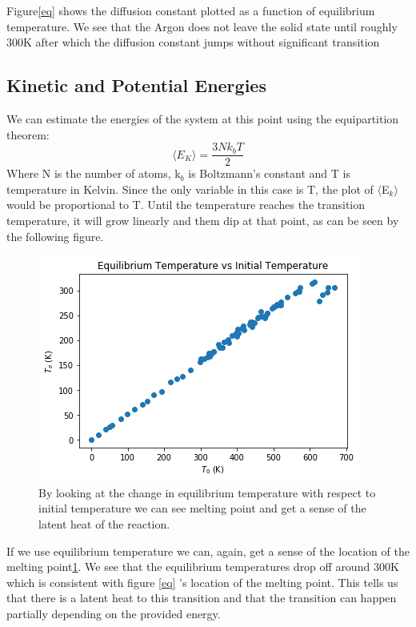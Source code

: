 \documentclass[11pt,twocolumn]{article}
\begin{document}
Figure\ref{eq} shows the diffusion constant plotted as a function of  equilibrium temperature. We see that the Argon does not leave the solid state until roughly 300K after which the diffusion constant jumps without significant transition 
\subsection{Kinetic and Potential Energies}
We can estimate the energies of the system at this point using the equipartition theorem\cite{Kinetic}:
\begin{equation}
\langle E_K\rangle=\frac{3Nk_bT}{2}
\end{equation}
Where N is the number of atoms, k$_b$ is Boltzmann's constant and T is temperature in Kelvin. Since the only variable in this case is T, the plot of $\langle$E$_k\rangle$ would be proportional to T. Until the temperature reaches the transition temperature, it will grow linearly and them dip at that point, as can be seen by the following figure.
\begin{figure}
\includegraphics[width=\columnwidth]{tevt0.png}
\caption{By looking at the change in equilibrium temperature with respect to initial temperature we can see melting point and get a sense of the latent heat of the reaction.}
\label{tevt0}
\end{figure}
If we use equilibrium temperature we can, again, get a sense of the location of the melting point\ref{tevt0}. We see that the equilibrium temperatures drop off around 300K which is consistent with figure \ref{eq} 's location of the melting point. This tells us that there is a latent heat to this transition and that the transition can happen partially depending on the provided energy.
\end{document}
